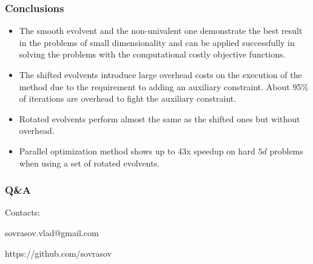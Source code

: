 \documentclass[aspectratio=1610]{beamer}
\begin{document}
\begin{frame}
  \frametitle{Conclusions}
    \begin{itemize}
      \item The smooth evolvent and the non-univalent one demonstrate the best result in the problems of small dimensionality and can be applied successfully in solving the problems with the computational costly objective functions.
      \item The shifted evolvents introduce large overhead costs on the execution of the method due to the requirement to adding an auxiliary constraint. About 95\% of iterations are overhead to fight the auxiliary constraint.
      \item Rotated evolvents perform almost the same as the shifted ones but without overhead.
      \item Parallel optimization method shows up to 43x speedup on hard \(5d\) problems when using a set of rotated evolvents.
    \end{itemize}
\end{frame}

\begin{frame}{{}}
  \frametitle{Q\&A}
  \begin{center}
    \Large{Contacts:}
\vspace{0.5cm}

    sovrasov.vlad@gmail.com

    https://github.com/sovrasov
  \end{center}
\end{frame}
\end{document}
